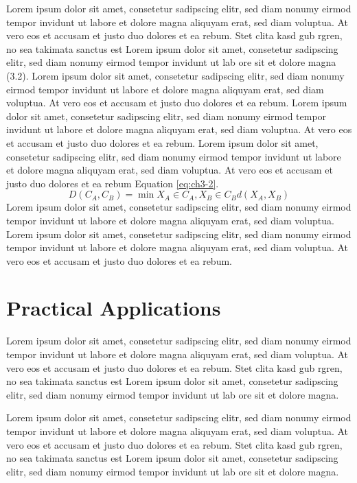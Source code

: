 Lorem ipsum dolor sit amet, consetetur sadipscing elitr, sed diam nonumy eirmod tempor invidunt ut labore et dolore magna aliquyam erat, sed diam voluptua. At vero eos et accusam et justo duo dolores et ea rebum. Stet clita kasd gub rgren, no sea takimata sanctus est Lorem ipsum dolor sit amet, consetetur sadipscing elitr, sed diam nonumy eirmod tempor invidunt ut lab ore sit et dolore magna (3.2). Lorem ipsum dolor sit amet, consetetur sadipscing elitr, sed diam nonumy eirmod tempor invidunt ut labore et dolore magna aliquyam erat, sed diam voluptua. At vero eos et accusam et justo duo dolores et ea rebum. Lorem ipsum dolor sit amet, consetetur sadipscing elitr, sed diam nonumy eirmod tempor invidunt ut labore et dolore magna aliquyam erat, sed diam voluptua. At vero eos et accusam et justo duo dolores et ea rebum. Lorem ipsum dolor sit amet, consetetur sadipscing elitr, sed diam nonumy eirmod tempor invidunt ut labore et dolore magna aliquyam erat, sed diam voluptua. At vero eos et accusam et justo duo dolores et ea rebum Equation \eqref{eq:ch3-2}.
%
\begin{equation}\label{eq:ch3-2}
	D\left(C_{A},C_{B}\right) = \min X_{A}\in C_{A},X_{B}\in C_{B} 
     d\left(X_{A},X_{B}\right)
\end{equation}
%
Lorem ipsum dolor sit amet, consetetur sadipscing elitr, sed diam nonumy eirmod tempor invidunt ut labore et dolore magna aliquyam erat, sed diam voluptua. Lorem ipsum dolor sit amet, consetetur sadipscing elitr, sed diam nonumy eirmod tempor invidunt ut labore et dolore magna aliquyam erat, sed diam voluptua. At vero eos et accusam et justo duo dolores et ea rebum.

\section{Practical Applications}

Lorem ipsum dolor sit amet, consetetur sadipscing elitr, sed diam nonumy eirmod tempor invidunt ut labore et dolore magna aliquyam erat, sed diam voluptua. At vero eos et accusam et justo duo dolores et ea rebum. Stet clita kasd gub rgren, no sea takimata sanctus est Lorem ipsum dolor sit amet, consetetur sadipscing elitr, sed diam nonumy eirmod tempor invidunt ut lab ore sit et dolore magna.

Lorem ipsum dolor sit amet, consetetur sadipscing elitr, sed diam nonumy eirmod tempor invidunt ut labore et dolore magna aliquyam erat, sed diam voluptua. At vero eos et accusam et justo duo dolores et ea rebum. Stet clita kasd gub rgren, no sea takimata sanctus est Lorem ipsum dolor sit amet, consetetur sadipscing elitr, sed diam nonumy eirmod tempor invidunt ut lab ore sit et dolore magna.

